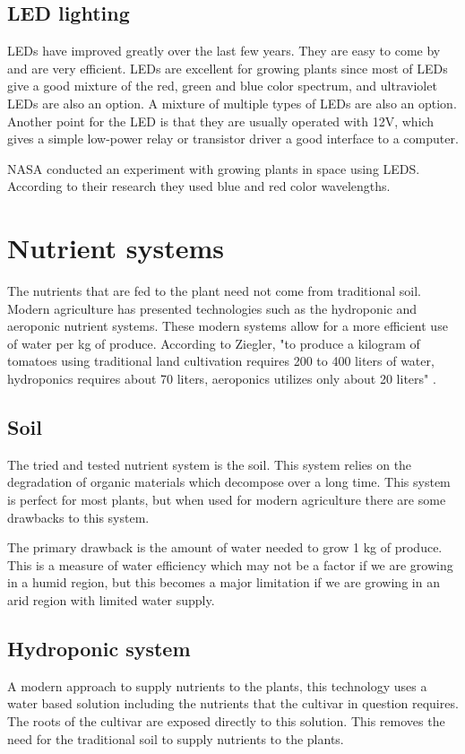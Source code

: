 \documentclass[12pt,a4paper,oneside]{book}
\begin{document}
\subsection{LED lighting}
LEDs have improved greatly over the last few years. They are easy to come by and are very efficient.
LEDs are excellent for growing plants since most of LEDs give a good mixture of the red, green and blue color spectrum, and ultraviolet LEDs are also an option.
A mixture of multiple types of LEDs are also an option.
Another point for the LED is that they are usually operated with 12V, which gives a simple low-power relay or transistor driver a good interface to a computer.

NASA conducted an experiment \cite{nasa_led} with growing plants in space using LEDS. According to their research they used blue and red color wavelengths.

\section{Nutrient systems}
The nutrients that are fed to the plant need not come from traditional soil.
Modern agriculture has presented technologies such as the hydroponic and aeroponic nutrient systems.
These modern systems allow for a more efficient use of water per kg of produce.
According to Ziegler, "to produce a kilogram of tomatoes using traditional land
cultivation requires 200 to 400 liters of water, hydroponics requires about 70 liters,
aeroponics utilizes only about 20 liters" \cite{aeroponic}.

\subsection{Soil}
The tried and tested nutrient system is the soil. This system relies on the degradation of organic materials which decompose over a long time. This system is perfect for most plants, but when used for modern agriculture there are some drawbacks to this system.

The primary drawback is the amount of water needed to grow 1 kg of produce. This is a measure of water efficiency which may not be a factor if we are growing in a humid region, but this becomes a major limitation if we are growing in an arid region with limited water supply.

\subsection{Hydroponic system}
A modern approach to supply nutrients to the plants, this technology uses a water based solution including the nutrients that the cultivar in question requires.
The roots of the cultivar are exposed directly to this solution.
This removes the need for the traditional soil to supply nutrients to the plants.
\end{document}
